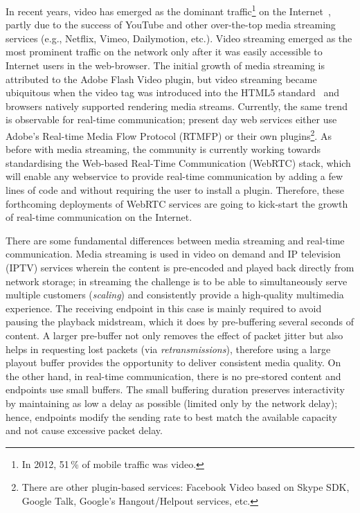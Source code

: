 In recent years, video has emerged as the dominant traffic\footnote{In 2012,
51\,\% of mobile traffic was video.} on the Internet~\cite{cvni.13,dawn.zb},
partly due to the success of YouTube and other over-the-top media streaming
services (e.g., Netflix, Vimeo, Dailymotion, etc.). Video streaming emerged as
the most prominent traffic on the network only after it was easily accessible
to Internet users in the web-browser. The initial growth of media streaming
is attributed to the Adobe Flash Video plugin, but video streaming became ubiquitous when
the video tag was introduced into the HTML5 standard~\cite{html5-spec} and
browsers natively supported rendering media streams. Currently, the same trend
is observable for real-time communication; present day web services either use
Adobe's Real-time Media Flow Protocol (RTMFP) \cite{RFC7016} or
their own plugins\footnote{There are other plugin-based services: Facebook
Video based on Skype SDK, Google Talk, Google's Hangout/Helpout services,
etc.}. As before with media streaming, the community is currently working
towards standardising the Web-based Real-Time Communication (WebRTC) stack,
which will enable any webservice to provide real-time communication by adding
a few lines of code and without requiring the user to install a plugin.
Therefore, these forthcoming deployments of WebRTC services are going to
kick-start the growth of real-time communication on the Internet.


There are some fundamental differences between media streaming and real-time
communication. Media streaming is used in video on demand and IP television
(IPTV) services wherein the content is pre-encoded and played back directly
from network storage; in streaming the challenge is to be able to simultaneously serve
multiple customers (\emph{scaling}) and consistently provide a high-quality
multimedia experience. The receiving endpoint in this case is mainly required
to avoid pausing the playback midstream, which it does by pre-buffering
several seconds of content. A larger pre-buffer not only removes the effect of
packet jitter but also helps in requesting lost packets (via
\emph{retransmissions}), therefore using a large playout buffer provides the
opportunity to deliver consistent media quality.
On the other hand, in real-time communication, there is no pre-stored content
and endpoints use small buffers. The small buffering duration preserves
interactivity by maintaining as low a delay as possible (limited only by the
network delay); hence, endpoints modify the sending rate to best match the
available capacity and not cause excessive packet delay.

